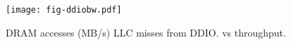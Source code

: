 \begin{figure}[t]
\texttt{[image: fig-ddiobw.pdf]}
\caption{DRAM accesses (MB/s) LLC misses from DDIO. vs throughput.}
\label{fig:ddiobw}
\end{figure}
